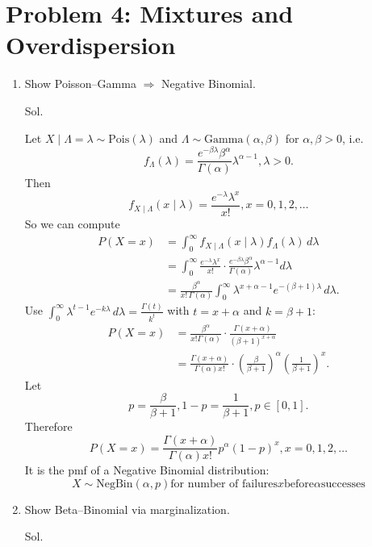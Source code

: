 \documentclass[a4paper, 12pt]{article}  %
\begin{document}
\section*{Problem 4: Mixtures and Overdispersion}
    \begin{enumerate}
        \item Show Poisson--Gamma $\Rightarrow$ Negative Binomial.
        
        Sol.

        Let $X\mid \Lambda=\lambda \sim \mathrm{Pois}(\lambda)$ and $\Lambda \sim \mathrm{Gamma}(\alpha,\beta)$ for $\alpha,　\beta>0$, i.e.
        $$f_\Lambda(\lambda)=\frac{e^{-\beta\lambda}\beta^\alpha}{\Gamma(\alpha)}\lambda^{\alpha-1},　\lambda>0.$$
        Then $$f_{X\mid \Lambda}(x\mid \lambda)=\frac{e^{-\lambda}\lambda^x}{x!},　 x=0,1,2,\dots$$
        So we can compute
        \begin{align*}
        P(X=x)
        &=\int_0^\infty f_{X\mid \Lambda}(x\mid \lambda)f_\Lambda(\lambda)\,d\lambda \\
        &=\int_0^\infty \frac{e^{-\lambda}\lambda^x}{x!}\cdot
        \frac{e^{-\beta\lambda}\beta^\alpha}{\Gamma(\alpha)}\lambda^{\alpha-1}d\lambda \\
        &=\frac{\beta^\alpha}{x!\,\Gamma(\alpha)}
        \int_0^\infty \lambda^{x+\alpha-1}e^{-(\beta+1)\lambda}\,d\lambda.
        \end{align*}
        Use $\int_0^\infty \lambda^{t-1}e^{-k\lambda}\,d\lambda=\frac{\Gamma(t)}{k^t}$ with $t=x+\alpha$ and $k=\beta+1$:
        \begin{align*}
            P(X=x)
            &=\frac{\beta^\alpha}{x!\Gamma(\alpha)}\cdot \frac{\Gamma(x+\alpha)}{(\beta+1)^{x+\alpha}} \\
            &=\frac{\Gamma(x+\alpha)}{\Gamma(\alpha)x!}\cdot \left(\frac{\beta}{\beta+1}\right)^\alpha \left(\frac{1}{\beta+1}\right)^x.
        \end{align*}
        Let
        $$p=\frac{\beta}{\beta+1},　1-p=\frac{1}{\beta+1},　p\in[0, 1].$$
        Therefore $$P(X=x)=\frac{\Gamma(x+\alpha)}{\Gamma(\alpha)x!}p^{\alpha}(1-p)^x,　x=0,1,2,\dots$$
        It is the pmf of a Negative Binomial distribution: $$X\sim \mathrm{NegBin}(\alpha,p)　\text{for number of failures}　x　\text{before}　\alpha　\text{successes}$$

        \item Show Beta--Binomial via marginalization.
        
        Sol.


\end{enumerate}
\end{document}
